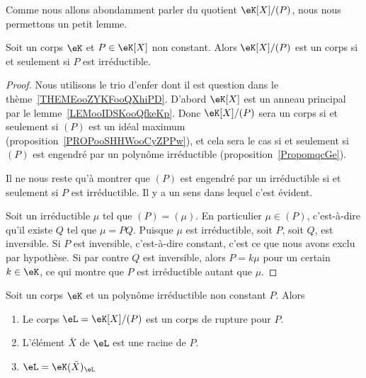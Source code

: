 Comme nous allons abondamment parler du quotient \( \eK[X]/(P)\), nous nous permettons un petit lemme.
\begin{lemma}       \label{LEMooWYYFooXYacdF}
	Soit un corps \( \eK\) et \( P\in \eK[X]\) non constant. Alors \( \eK[X]/(P)\) est un corps si et seulement si \( P\) est irréductible.
\end{lemma}

\begin{proof}
	Nous utilisons le trio d'enfer dont il est question dans le thème~\ref{THEMEooZYKFooQXhiPD}. D'abord \( \eK[X]\) est un anneau principal par le lemme~\ref{LEMooIDSKooQfkeKp}. Donc \( \eK[X]/(P)\) sera un corps si et seulement si \( (P)\) est un idéal maximum (proposition~\ref{PROPooSHHWooCyZPPw}), et cela sera le cas si et seulement si \( (P)\) est engendré par un polynôme irréductible (proposition~\ref{PropomqcGe}).

	Il ne nous reste qu'à montrer que \( (P)\) est engendré par un irréductible si et seulement si \( P\) est irréductible. Il y a un sens dans lequel c'est évident.

	Soit un irréductible \( \mu\) tel que \( (P)=(\mu)\). En particulier \( \mu\in (P)\), c'est-à-dire qu'il existe \( Q\) tel que \( \mu=PQ\). Puisque \( \mu\) est irréductible, soit \( P\), soit \( Q\), est inversible. Si \( P\) est inversible, c'est-à-dire constant, c'est ce que nous avons exclu par hypothèse. Si par contre \( Q\) est inversible, alors \( P=k\mu\) pour un certain \( k\in \eK\), ce qui montre que \( P\) est irréductible autant que \( \mu\).
\end{proof}

\begin{proposition}        \label{PROPooUBIIooGZQyeE}
	Soit un corps \( \eK\) et un polynôme irréductible non constant \( P\). Alors
	\begin{enumerate}
		\item
		      Le corps \( \eL=\eK[X]/(P)\) est un corps de rupture pour \( P\).
		\item
		      L'élément \( \bar X\) de \( \eL\) est une racine de \( P\).
		\item
		      \( \eL=\eK(\bar X)_{\eL}\)
	\end{enumerate}
\end{proposition}

